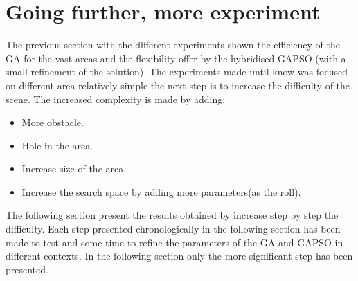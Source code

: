    
		
\section{Going further, more experiment }

The previous section with the different experiments shown the efficiency of the GA for the vast areas and the flexibility offer by the hybridised GAPSO (with a small refinement of the solution). The experiments made until know was focused on different area relatively simple the next step is to increase the difficulty of the scene. The increased complexity is made by adding: 
\begin{itemize}
\item More obstacle.
\item Hole in the area.
\item Increase size of the area.
\item Increase the search space by adding more parameters(as the roll). 
\end{itemize} 
The following section present the results obtained by increase step by step the difficulty. Each step presented chronologically in the following section has been made to test and some time to refine the parameters of the GA and GAPSO in different contexts. In the following section only the more significant step has been presented.

